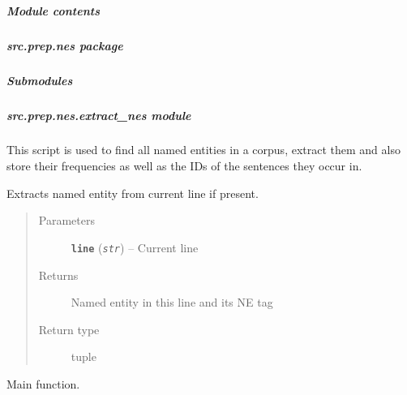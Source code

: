 \documentclass[letterpaper,10pt,english]{sphinxmanual}
\begin{document}
\subparagraph{Module contents}
\label{src.prep.corpus:module-contents}\label{src.prep.corpus:module-src.prep.corpus}

\subparagraph{src.prep.nes package}
\label{src.prep.nes:src-prep-nes-package}\label{src.prep.nes::doc}

\subparagraph{Submodules}
\label{src.prep.nes:submodules}

\subparagraph{src.prep.nes.extract\_nes module}
\label{src.prep.nes:src-prep-nes-extract-nes-module}\label{src.prep.nes:module-src.prep.nes.extract_nes}
This script is used to find all named entities in a corpus, extract them and also store their frequencies as well as
the IDs of the sentences they occur in.

\begin{fulllineitems}
\label{src.prep.nes:src.prep.nes.extract_nes.extract_named_entity}
Extracts named entity from current line if present.
\begin{quote}\begin{description}
\item[{Parameters}] \leavevmode
\textbf{\texttt{line}} (\emph{\texttt{str}}) -- Current line

\item[{Returns}] \leavevmode
Named entity in this line and its NE tag

\item[{Return type}] \leavevmode
tuple

\end{description}\end{quote}

\end{fulllineitems}


\begin{fulllineitems}
\label{src.prep.nes:src.prep.nes.extract_nes.main}
Main function.

\end{fulllineitems}

\end{document}

